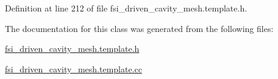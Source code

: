 Definition at line 212 of file fsi\+\_\+driven\+\_\+cavity\+\_\+mesh.\+template.\+h.



The documentation for this class was generated from the following files\+:\begin{DoxyCompactItemize}
\item 
\hyperlink{fsi__driven__cavity__mesh_8template_8h}{fsi\+\_\+driven\+\_\+cavity\+\_\+mesh.\+template.\+h}\item 
\hyperlink{fsi__driven__cavity__mesh_8template_8cc}{fsi\+\_\+driven\+\_\+cavity\+\_\+mesh.\+template.\+cc}\end{DoxyCompactItemize}
